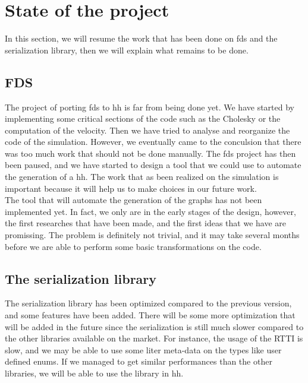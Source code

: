 
\section{State of the project}

In this section, we will resume the work that has been done on \gls{fds} and the
serialization library, then we will explain what remains to be done.

\subsection{FDS}

The project of porting \gls{fds} to \gls{hh} is far from being done yet. We have
started by implementing some critical sections of the code such as the Cholesky
or the computation of the velocity. Then we have tried to analyse and reorganize
the code of the simulation. However, we eventually came to the conculsion that
there was too much work that should not be done manually. The \gls{fds} project
has then been paused, and we have started to design a tool that we could use to
automate the generation of a \gls{hh}. The work that as been realized on the
simulation is important because it will help us to make choices in our future
work.\\

The tool that will automate the generation of the graphs has not been
implemented yet. In fact, we only are in the early stages of the design,
however, the first researches that have been made, and the first ideas that we
have are promissing. The problem is definitely not trivial, and it may take
several months before we are able to perform some basic transformations on the
code.

\subsection{The serialization library}

The serialization library has been optimized compared to the previous version,
and some features have been added. There will be some more optimization that
will be added in the future since the serialization is still much slower
compared to the other libraries available on the market. For instance, the usage
of the RTTI is slow, and we may be able to use some liter meta-data on the types
like user defined enums. If we managed to get similar performances than the
other libraries, we will be able to use the library in \gls{hh}.
